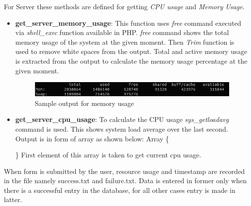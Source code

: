 \documentclass[11pt]{article}
\begin{document}
    \vspace{.5em}
    For Server these methods are defined for getting \textit{CPU usage} and \textit{Memory Usage}.
        \begin{itemize}
            \item \textbf{get\_server\_memory\_usage}:
                This function uses \textit{free} command executed via \textit{shell\_exec} function available in PHP. \textit{free} command shows the total memory usage of the system at the given moment. Then \textit{Trim} function is used to remove white spaces from the output. Total and active memory usage is extracted from the output to calculate the memory usage percentage at the given moment.
        
                \begin{figure}
                \centerline{\includegraphics[scale=.75]{memory-usage.jpeg}}
                \caption{Sample output for memory usage}
                \end{figure}
        
            \item \textbf{get\_server\_cpu\_usage}:
                To calculate the CPU usage \textit{sys\_getloadavg} command is used. This shows system load average over the last second.
                Output is in form of array as shown below:
                Array \newline
                \{
                \} \newline
                First element of this array is taken to get current cpu usage.
        \end{itemize}
        
        When form is submitted by the user, resource usage and timestamp are recorded in the file namely success.txt and failure.txt. Data is entered in former only when there is a successful entry in the database, for all other cases entry is made in latter. \par
        
\end{document}
